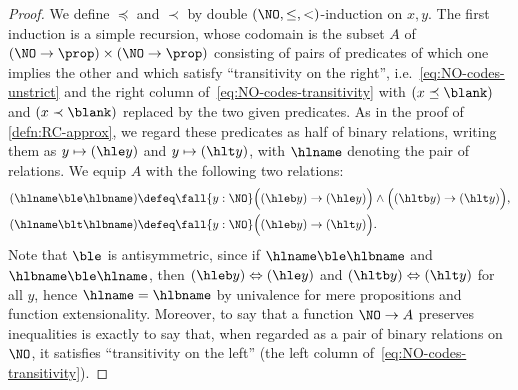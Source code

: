 \begin{proof}
  We define $\preceq$ and $\prec$ by double $(\NO,\le,<)$-induction on $x,y$.
  The first induction is a simple recursion, whose codomain is the subset $A$ of $(\NO\to\prop)\times (\NO\to\prop)$ consisting of pairs of predicates of which one implies the other and which satisfy ``transitivity on the right'', i.e.~\eqref{eq:NO-codes-unstrict} and the right column of~\eqref{eq:NO-codes-transitivity} with $(x\preceq \blank)$ and $(x\prec \blank)$ replaced by the two given predicates.
  As in the proof of \cref{defn:RC-approx}, we regard these predicates as half of binary relations, writing them as $y\mapsto (\hle y)$ and $y\mapsto (\hlt y)$, with $\hlname$ denoting the pair of relations.
  We equip $A$ with the following two relations:
  \begin{align*}
    (\hlname \ble \hlbname) &\defeq
    \fall{y:\NO} \Big( (\hleb y) \to (\hle y) \Big) \land
    \Big( (\hltb y) \to (\hlt y) \Big),\\
    (\hlname \blt \hlbname) &\defeq
    \fall{y:\NO} \Big( (\hleb y) \to (\hlt y) \Big).
  \end{align*}
  Note that $\ble$ is antisymmetric, since if $\hlname \ble \hlbname$ and $\hlbname \ble \hlname$, then $(\hleb y) \Leftrightarrow (\hle y)$ and $(\hltb y) \Leftrightarrow (\hlt y)$ for all $y$, hence $\hlname=\hlbname$ by univalence for mere propositions and function extensionality.
  Moreover, to say that a function $\NO\to A$ preserves inequalities is exactly to say that, when regarded as a pair of binary relations on $\NO$, it satisfies ``transitivity on the left'' (the left column of~\eqref{eq:NO-codes-transitivity}).


\end{proof}
